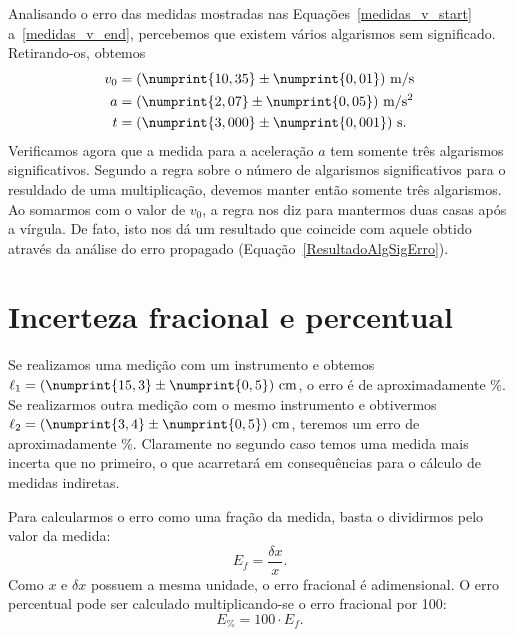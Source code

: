 Analisando o erro das medidas mostradas nas Equações~\eqref{medidas_v_start} a~\eqref{medidas_v_end}, percebemos que existem vários algarismos sem significado. Retirando-os, obtemos
\begin{align}
	v_0 &= (\numprint{10,35} \pm \numprint{0,01})~\textrm{m}/\textrm{s} \\
	a &= (\numprint{2,07} \pm \numprint{0,05})~\textrm{m}/\textrm{s}^2 \\
	t &= (\numprint{3,000} \pm \numprint{0,001})~\textrm{s}.
\end{align}
%
Verificamos agora que a medida para a aceleração $a$ tem somente três algarismos significativos. Segundo a regra sobre o número de algarismos significativos para o resuldado de uma multiplicação, devemos manter então somente três algarismos. Ao somarmos com o valor de $v_0$, a regra nos diz para mantermos duas casas após a vírgula. De fato, isto nos dá um resultado que coincide com aquele obtido através da análise do erro propagado (Equação~\eqref{ResultadoAlgSigErro}).


\section{Incerteza fracional e percentual}

Se realizamos uma medição com um instrumento e obtemos $\ell_1 = (\numprint{15,3} \pm \numprint{0,5})~\textrm{cm}$, o erro é de aproximadamente \%. Se realizarmos outra medição com o mesmo instrumento e obtivermos $\ell_2 = (\numprint{3,4} \pm \numprint{0,5})~\textrm{cm}$, teremos um erro de aproximadamente \%. Claramente no segundo caso temos uma medida mais incerta que no primeiro, o que acarretará em consequências para o cálculo de medidas indiretas.

Para calcularmos o erro como uma fração da medida, basta o dividirmos pelo valor da medida:
\begin{equation}
	E_f = \frac{\delta x}{x}.
\end{equation}
%
Como $x$ e $\delta x$ possuem a mesma unidade, o erro fracional é adimensional. O erro percentual pode ser calculado multiplicando-se o erro fracional por 100:
\begin{equation}
	E_\% = 100 \cdot E_f.
\end{equation}

